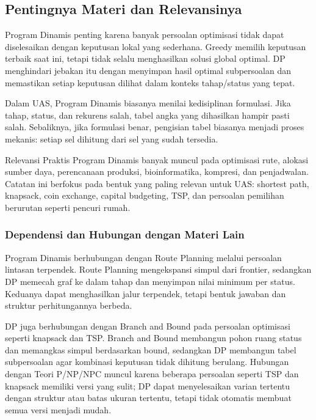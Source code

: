 \subsection{Pentingnya Materi dan Relevansinya}

Program Dinamis penting karena banyak persoalan optimisasi tidak dapat diselesaikan dengan keputusan lokal yang sederhana. Greedy memilih keputusan terbaik saat ini, tetapi tidak selalu menghasilkan solusi global optimal. DP menghindari jebakan itu dengan menyimpan hasil optimal subpersoalan dan memastikan setiap keputusan dilihat dalam konteks tahap/status yang tepat.

Dalam UAS, Program Dinamis biasanya menilai kedisiplinan formulasi. Jika tahap, status, dan rekurens salah, tabel angka yang dihasilkan hampir pasti salah. Sebaliknya, jika formulasi benar, pengisian tabel biasanya menjadi proses mekanis: setiap sel dihitung dari sel yang sudah tersedia.

\begin{cmt}{Relevansi Praktis}{}
Program Dinamis banyak muncul pada optimisasi rute, alokasi sumber daya, perencanaan produksi, bioinformatika, kompresi, dan penjadwalan. Catatan ini berfokus pada bentuk yang paling relevan untuk UAS: shortest path, knapsack, coin exchange, capital budgeting, TSP, dan persoalan pemilihan berurutan seperti pencuri rumah.
\end{cmt}

\subsubsection{Dependensi dan Hubungan dengan Materi Lain}

Program Dinamis berhubungan dengan Route Planning melalui persoalan lintasan terpendek. Route Planning mengekspansi simpul dari frontier, sedangkan DP memecah graf ke dalam tahap dan menyimpan nilai minimum per status. Keduanya dapat menghasilkan jalur terpendek, tetapi bentuk jawaban dan struktur perhitungannya berbeda.

DP juga berhubungan dengan Branch and Bound pada persoalan optimisasi seperti knapsack dan TSP. Branch and Bound membangun pohon ruang status dan memangkas simpul berdasarkan bound, sedangkan DP membangun tabel subpersoalan agar kombinasi keputusan tidak dihitung berulang. Hubungan dengan Teori P/NP/NPC muncul karena beberapa persoalan seperti TSP dan knapsack memiliki versi yang sulit; DP dapat menyelesaikan varian tertentu dengan struktur atau batas ukuran tertentu, tetapi tidak otomatis membuat semua versi menjadi mudah.

